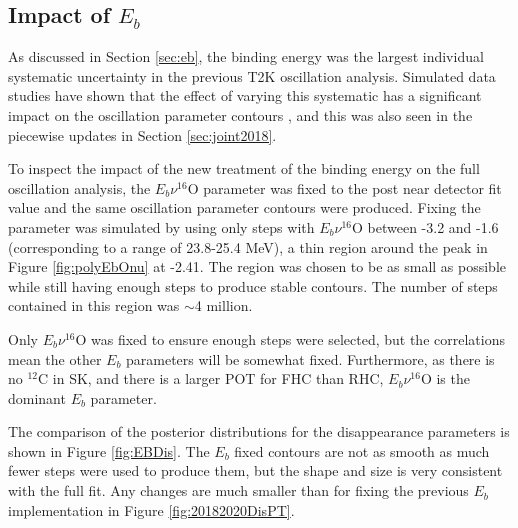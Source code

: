 \subsection{Impact of $E_{b}$}\label{sec:jointeb}

As discussed in Section \ref{sec:eb}, the binding energy was the largest individual systematic uncertainty in the previous T2K oscillation analysis. Simulated data studies have shown that the effect of varying this systematic has a significant impact on the oscillation parameter contours \cite{tn331}, and this was also seen in the piecewise updates in Section \ref{sec:joint2018}.

To inspect the impact of the new treatment of the binding energy on the full oscillation analysis, the $E_b \nu ^{16}$O parameter was fixed to the post near detector fit value and the same oscillation parameter contours were produced. Fixing the parameter was simulated by using only steps with $E_b \nu ^{16}$O between -3.2 and -1.6 (corresponding to a range of 23.8-25.4 MeV), a thin region around the peak in Figure \ref{fig:polyEbOnu} at -2.41. The region was chosen to be as small as possible while still having enough steps to produce stable contours. The number of steps contained in this region was $\sim$4 million.

Only $E_b \nu ^{16}$O was fixed to ensure enough steps were selected, but the correlations mean the other $E_{b}$ parameters will be somewhat fixed. Furthermore, as there is no $^{12}$C in SK, and there is a larger POT for FHC than RHC, $E_b \nu ^{16}$O is the dominant $E_b$ parameter.

The comparison of the posterior distributions for the disappearance parameters is shown in Figure \ref{fig:EBDis}. The $E_b$ fixed contours are not as smooth as much fewer steps were used to produce them, but the shape and size is very consistent with the full fit. Any changes are much smaller than for fixing the previous $E_b$ implementation in Figure \ref{fig:20182020DisPT}.


